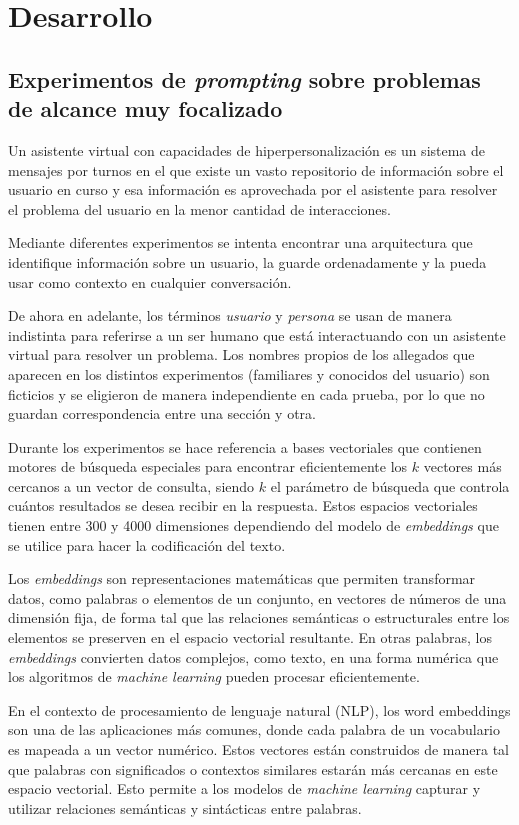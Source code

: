 \section{Desarrollo}
\subsection{Experimentos de \textit{prompting} sobre problemas de alcance muy focalizado}

Un asistente virtual con capacidades de hiperpersonalización es un sistema de mensajes por turnos en el que existe un vasto repositorio de información sobre el usuario en curso y esa información es aprovechada por el asistente para resolver el problema del usuario en la menor cantidad de interacciones.

Mediante diferentes experimentos se intenta encontrar una arquitectura que identifique información sobre un usuario, la guarde ordenadamente y la pueda usar como contexto en cualquier conversación.

De ahora en adelante, los términos \textit{usuario} y \textit{persona} se usan de manera indistinta para referirse a un ser humano que está interactuando con un asistente virtual para resolver un problema. Los nombres propios de los allegados que aparecen en los distintos experimentos (familiares y conocidos del usuario) son ficticios y se eligieron de manera independiente en cada prueba, por lo que no guardan correspondencia entre una sección y otra.

Durante los experimentos se hace referencia a bases vectoriales que contienen motores de búsqueda especiales para encontrar eficientemente los $k$ vectores más cercanos a un vector de consulta, siendo $k$ el parámetro de búsqueda que controla cuántos resultados se desea recibir en la respuesta. Estos espacios vectoriales tienen entre 300 y 4000 dimensiones dependiendo del modelo de \textit{embeddings} que se utilice para hacer la codificación del texto.

Los \textit{embeddings} son representaciones matemáticas que permiten transformar datos, como palabras o elementos de un conjunto, en vectores de números de una dimensión fija, de forma tal que las relaciones semánticas o estructurales entre los elementos se preserven en el espacio vectorial resultante. En otras palabras, los \textit{embeddings} convierten datos complejos, como texto, en una forma numérica que los algoritmos de \textit{machine learning} pueden procesar eficientemente.

En el contexto de procesamiento de lenguaje natural (NLP), los word embeddings son una de las aplicaciones más comunes, donde cada palabra de un vocabulario es mapeada a un vector numérico. Estos vectores están construidos de manera tal que palabras con significados o contextos similares estarán más cercanas en este espacio vectorial. Esto permite a los modelos de \textit{machine learning} capturar y utilizar relaciones semánticas y sintácticas entre palabras.

